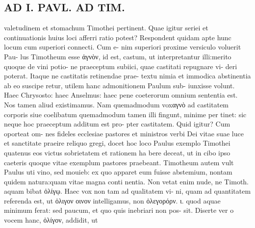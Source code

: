 \documentclass{article}
\begin{document}
\begin{pages}
\section*{AD I. PAVL. AD TIM. }
\marginpar{[ p.368 ]}valetudinem et stomachum Timothei pertinent. Quae igitur seriei et continuationis huius loci afferri ratio potest? Respondent quidam apte hunc locum cum superiori connecti. Cum e- nim superiori proxime versiculo voluerit Pau- lus Timotheum esse ἀγνὸν, id est, castum, ut interpretantur illi:merito quoque de vini potio- ne praeceptum subiici, quae castitati repugnare vi- deri poterat. Itaque ne castitatis retinendae prae- textu nimia et immodica abstinentia ab eo suscipe retur, utilem hanc admonitionem Paulum sub- iunxisse volunt. Haec Chrysosto: haec Anselmus: haec pene coeterorum omnium sententia est. Nos tamen aliud existimamus. Nam quemadmodum voxαγνὸ ad castitatem corporis siue coelibatum quemadmodum tamen illi fingunt, minime per tinet: sic neque hoc praeceptum additum est pro- pter castitatem. Quid igitur? Cum oporteat om- nes fideles ecclesiae pastores et ministros verbi Dei vitae suae luce et sanctitate praeire reliquo gregi, docet hoc loco Paulus exemplo Timothei quatenus eos victus sobrietatem et rationem ha bere deceat, ut in cibo ipso caeteris quoque vitae exemplum pastores praebeant. Timotheum autem vult Paulus uti vino, sed mouieb: ex quo apparet eum fuisse abstemium, nontam quidem natura:quam vitae magna conti nentia. Non vetat enim nude, ne Timoth. aquam bibat ὀλίγῳ. Haec vox non tam ad qualitatem vi- ni, quam ad quantitatem referenda est, ut ὀλιγον οινον intelligamus, non ὀλεγορόρν. ι. quod aquae minimum ferat: sed paucum, et quo quis inebriari non pos- sit. Diserte ver o vocem hanc, ὀλίγον, addidit, ut 

\end{pages}
\end{document}
